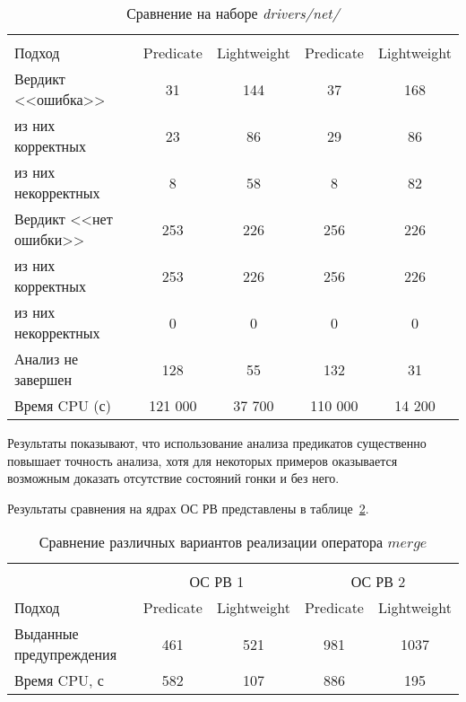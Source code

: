   \begin{table}[h]\footnotesize \centering
    \caption{Сравнение на наборе \textit{drivers/net/}}
  	\label{table-drivers-predicate}
    \begin{tabular}{ | l | c | c | c | c |}
      \hline
      & 			 \multicolumn{2}{c|}{\theoryraces} & 	\multicolumn{2}{c|}{\combatmode}\\
      Подход         				& Predicate & Lightweight 	& Predicate & Lightweight\\ \hline
      Вердикт <<ошибка>> 				& 31   		& 144   	& 37   		& 168  	\\ 
  \hspace{0.5cm} из них корректных 	& 23 		& 86 		& 29   		& 86 	\\ 
  \hspace{0.5cm} из них некорректных & 8 		& 58 		& 8   		& 82 	\\ \hline
      Вердикт <<нет ошибки>>  		& 253    	& 226    	& 256   	& 226 	\\ 
  \hspace{0.5cm} из них корректных 	& 253 		& 226    	& 256   	& 226 	\\
  \hspace{0.5cm} из них некорректных & 0 		& 0    		& 0   		& 0 	\\ \hline
      Анализ не завершен       		& 128    	& 55    	& 132   	& 31  	\\ \hline
      Время CPU (с)   				& 121 000 	& 37 700 	& 110 000  	& 14 200\\ 
      \hline
    \end{tabular}
  \end{table}

Результаты показывают, что использование анализа предикатов существенно повышает точность анализа, хотя для некоторых примеров оказывается возможным доказать отсутствие состояний гонки и без него.

Результаты сравнения на ядрах ОС РВ представлены в таблице~\ref{table-os-predicate}.

  \begin{table}[h] \footnotesize \centering
    \caption{Сравнение различных вариантов реализации оператора $merge$}
  	\label{table-os-predicate}
    \begin{tabular}{ | l | c | c | c | c |  }
      \hline
      		& 		\multicolumn{4}{c|}{\combatmode}  \\
      		& 			 \multicolumn{2}{c|}{ОС РВ 1} & 	\multicolumn{2}{c|}{ОС РВ 2}\\
      Подход         					& Predicate  & Lightweight 	& Predicate  & Lightweight 	\\ \hline
      Выданные предупреждения			& 461   	& 521    		& 981   	& 1037  			\\ 
  	  Время CPU, с 						& 582   	& 107  			& 886   	& 195  		\\ 
      \hline
    \end{tabular}
  \end{table}
  
